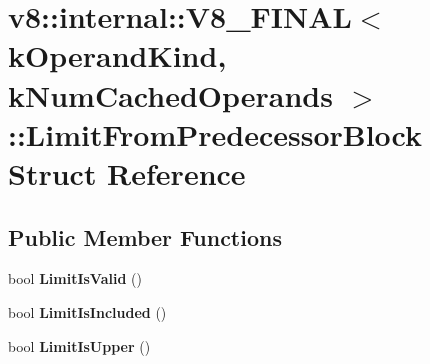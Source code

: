 \hypertarget{structv8_1_1internal_1_1_v8___f_i_n_a_l_1_1_limit_from_predecessor_block}{}\section{v8\+:\+:internal\+:\+:V8\+\_\+\+F\+I\+N\+A\+L$<$ k\+Operand\+Kind, k\+Num\+Cached\+Operands $>$\+:\+:Limit\+From\+Predecessor\+Block Struct Reference}
\label{structv8_1_1internal_1_1_v8___f_i_n_a_l_1_1_limit_from_predecessor_block}
\subsection*{Public Member Functions}
\begin{DoxyCompactItemize}
\item 
\hypertarget{structv8_1_1internal_1_1_v8___f_i_n_a_l_1_1_limit_from_predecessor_block_a3e45577b729f057fd32dacd3fc2aa613}{}bool {\bfseries Limit\+Is\+Valid} ()\label{structv8_1_1internal_1_1_v8___f_i_n_a_l_1_1_limit_from_predecessor_block_a3e45577b729f057fd32dacd3fc2aa613}

\item 
\hypertarget{structv8_1_1internal_1_1_v8___f_i_n_a_l_1_1_limit_from_predecessor_block_a29cfc30c9caa0f270e049b14ecf0525c}{}bool {\bfseries Limit\+Is\+Included} ()\label{structv8_1_1internal_1_1_v8___f_i_n_a_l_1_1_limit_from_predecessor_block_a29cfc30c9caa0f270e049b14ecf0525c}

\item 
\hypertarget{structv8_1_1internal_1_1_v8___f_i_n_a_l_1_1_limit_from_predecessor_block_a30468af7bae21586634e60ff1e3844cb}{}bool {\bfseries Limit\+Is\+Upper} ()\label{structv8_1_1internal_1_1_v8___f_i_n_a_l_1_1_limit_from_predecessor_block_a30468af7bae21586634e60ff1e3844cb}

\end{DoxyCompactItemize}

